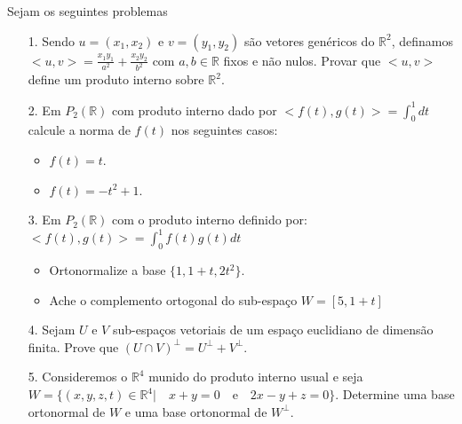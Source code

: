 Sejam os seguintes problemas

\begin{itemize}
	\item[1.] Sendo $u=(x_{1},x_{2})$ e $v=(y_{1},y_{2})$ são vetores genéricos do $\mathbb{R}^{2}$, definamos $<u,v>=\frac{x_{1}y_{1}}{a^{2}}+\frac{x_{2}y_{2}}{b^{2}}$ com $a,b\in \mathbb{R}$ fixos e não nulos. Provar que $<u,v>$ define um produto interno sobre $\mathbb{R}^{2}$.
\end{itemize}
\begin{itemize}
	\item[2.] Em $P_{2}(\mathbb{R})$ com produto interno dado por $<f(t),g(t)>=\int_{0}^{1}dt$ calcule a norma de $f(t)$ nos seguintes casos:
	\begin{itemize}
		\item $f(t)=t$.
		\item $f(t)=-t^{2}+1$.
	\end{itemize}
\end{itemize}
\begin{itemize}
	\item [3.] Em $P_{2}(\mathbb{R})$ com o produto interno definido por: $<f(t),g(t)>=\int_{0}^{1}f(t)g(t)dt$ 
	\begin{itemize}
		\item Ortonormalize a base $\{1,1+t,2t^{2}\}$.
		\item Ache o complemento ortogonal do sub-espaço $W=[5,1+t]$
	\end{itemize}
\end{itemize}
\begin{itemize}
	\item[4.] Sejam $U$ e $V$ sub-espaços vetoriais de um espaço euclidiano de dimensão finita. Prove que  $(U\cap V)^{\bot}=U^{\bot}+V^{\bot}$.
\end{itemize}
\begin{itemize}
	\item[5.] Consideremos o $\mathbb{R}^{4}$ munido do produto interno usual e seja $W=\{(x,y,z,t)\in \mathbb{R}^{4}|\quad x+y=0 \quad\text{e}\quad 2x-y+z=0\}$. Determine uma base ortonormal de $W$ e uma base ortonormal de $W^{\bot}$.
\end{itemize}

